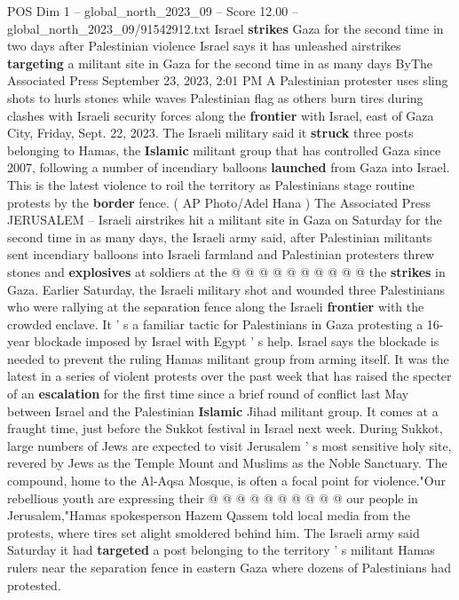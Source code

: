 \begin{textsample}{POS Dim 1 – global\_north\_2023\_09 – Score 12.00 – global\_north\_2023\_09/91542912.txt}  \label{ex:f1_pos_113}
Israel \textbf{strikes} Gaza for the second time in two days after Palestinian violence Israel says it has unleashed airstrikes \textbf{targeting} a militant site in Gaza for the second time in as many days ByThe Associated Press September 23, 2023, 2:01 PM A Palestinian protester uses sling shots to hurls stones while waves Palestinian flag as others burn tires during clashes with Israeli security forces along the \textbf{frontier} with Israel, east of Gaza City, Friday, Sept. 22, 2023.
The Israeli military said it \textbf{struck} three posts belonging to Hamas, the \textbf{Islamic} militant group that has controlled Gaza since 2007, following a number of incendiary balloons \textbf{launched} from Gaza into Israel.
This is the latest violence to roil the territory as Palestinians stage routine protests by the \textbf{border} fence. ( AP Photo/Adel Hana ) The Associated Press JERUSALEM -- Israeli airstrikes hit a militant site in Gaza on Saturday for the second time in as many days, the Israeli army said, after Palestinian militants sent incendiary balloons into Israeli farmland and Palestinian protesters threw stones and \textbf{explosives} at soldiers at the @ @ @ @ @ @ @ @ @ @ the \textbf{strikes} in Gaza.
Earlier Saturday, the Israeli military shot and wounded three Palestinians who were rallying at the separation fence along the Israeli \textbf{frontier} with the crowded enclave.
It ' s a familiar tactic for Palestinians in Gaza protesting a 16-year blockade imposed by Israel with Egypt ' s help.
Israel says the blockade is needed to prevent the ruling Hamas militant group from arming itself.
It was the latest in a series of violent protests over the past week that has raised the specter of an \textbf{escalation} for the first time since a brief round of conflict last May between Israel and the Palestinian \textbf{Islamic} Jihad militant group.
It comes at a fraught time, just before the Sukkot festival in Israel next week.
During Sukkot, large numbers of Jews are expected to visit Jerusalem ' s most sensitive holy site, revered by Jews as the Temple Mount and Muslims as the Noble Sanctuary.
The compound, home to the Al-Aqsa Mosque, is often a focal point for violence."Our rebellious youth are expressing their @ @ @ @ @ @ @ @ @ @ our people in Jerusalem,"Hamas spokesperson Hazem Qassem told local media from the protests, where tires set alight smoldered behind him.
The Israeli army said Saturday it had \textbf{targeted} a post belonging to the territory ' s militant Hamas rulers near the separation fence in eastern Gaza where dozens of Palestinians had protested.

\end{textsample}
